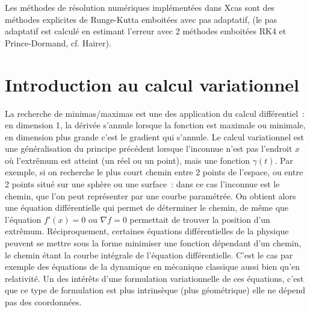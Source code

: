\documentclass[a4paper,11pt]{article}
\begin{document}
\begin{giacjshere}
Les méthodes de résolution numériques implémentées dans Xcas sont
des méthodes explicites de Runge-Kutta emboitées avec pas adaptatif, 
(le pas adaptatif est calcul\'e en estimant l'erreur 
avec 2 méthodes emboitées RK4 et
Prince-Dormand, cf. Hairer).


\section{Introduction au calcul variationnel}
La recherche de minimas/maximas est une des application 
du calcul diff\'erentiel~: en dimension 1, la d\'eriv\'ee s'annule
lorsque la fonction est maximale ou minimale, en dimension plus
grande c'est le gradient qui s'annule. Le calcul variationnel
est une g\'en\'eralisation du principe pr\'ec\'edent lorsque
l'inconnue n'est pas l'endroit $x$ o\`u l'extr\^emum est atteint
(un r\'eel ou un point), mais une fonction $\gamma(t)$. 
Par exemple, si on recherche
le plus court chemin entre 2 points de l'espace, ou entre 2 points
situ\'e sur une sph\`ere ou une surface~: dans ce cas l'inconnue
est le chemin, que l'on peut repr\'esenter par une courbe 
param\'etr\'ee. On obtient alors une \'equation diff\'erentielle
qui permet de d\'eterminer le chemin, de m\^eme que l'\'equation
$f'(x)=0$ ou $\nabla f=0$ permettait de trouver la position
d'un extr\^emum. R\'eciproquement, certaines \'equations
diff\'erentielles de la physique peuvent se mettre sous la forme minimiser une
fonction d\'ependant d'un chemin, le chemin \'etant la courbe
int\'egrale de l'\'equation diff\'erentielle. C'est le cas par
exemple des \'equations de la dynamique en m\'ecanique
classique aussi bien qu'en relativit\'e. Un des int\'er\^ets d'une
formulation variationnelle de ces \'equations, c'est que ce type
de formulation est plus intrins\`eque (plus g\'eom\'etrique) 
elle ne d\'epend pas des coordonn\'ees.


\end{giacjshere}
\end{document}
